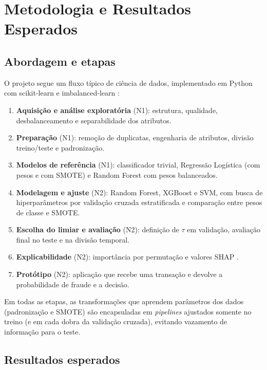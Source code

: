 \documentclass[12pt]{article}
\begin{document}
\section{Metodologia e Resultados Esperados}

\subsection{Abordagem e etapas}

O projeto segue um fluxo típico de ciência de dados, implementado em Python com
scikit-learn \cite{pedregosa:2011} e imbalanced-learn \cite{lemaitre:2017}:

\begin{enumerate}
\item \textbf{Aquisição e análise exploratória} (N1): estrutura, qualidade,
desbalanceamento e separabilidade dos atributos.
\item \textbf{Preparação} (N1): remoção de duplicatas, engenharia de atributos,
divisão treino/teste e padronização.
\item \textbf{Modelos de referência} (N1): classificador trivial, Regressão
Logística (com pesos e com SMOTE) e Random Forest com pesos balanceados.
\item \textbf{Modelagem e ajuste} (N2): Random Forest, XGBoost e SVM, com busca
de hiperparâmetros por validação cruzada estratificada e comparação entre
pesos de classe e SMOTE.
\item \textbf{Escolha do limiar e avaliação} (N2): definição de $\tau$ em
validação, avaliação final no teste e na divisão temporal.
\item \textbf{Explicabilidade} (N2): importância por permutação e valores SHAP
\cite{lundberg:2017}.
\item \textbf{Protótipo} (N2): aplicação que recebe uma transação e devolve a
probabilidade de fraude e a decisão.
\end{enumerate}

Em todas as etapas, as transformações que aprendem parâmetros dos dados
(padronização e SMOTE) são encapsuladas em \emph{pipelines} ajustados somente
no treino (e em cada dobra da validação cruzada), evitando vazamento de
informação para o teste.

\subsection{Resultados esperados}
\end{document}
